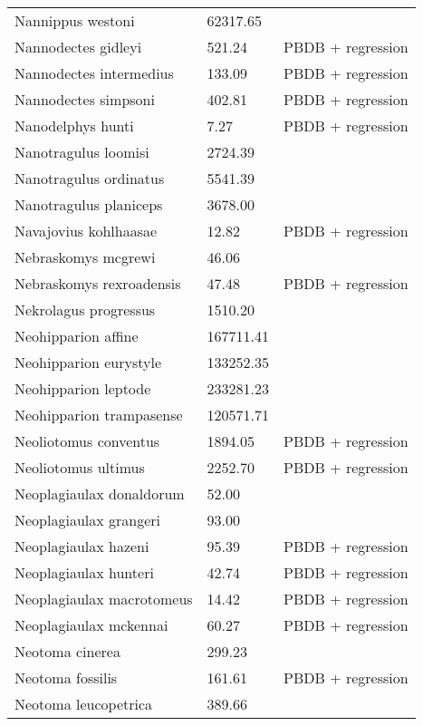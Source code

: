 \begin{center}
\begin{longtable}{p{} p{} p{} }
  Nannippus westoni & 62317.65 & \cite{Tomiya2013} \\ 
  Nannodectes gidleyi & 521.24 & PBDB + regression \\ 
  Nannodectes intermedius & 133.09 & PBDB + regression \\ 
  Nannodectes simpsoni & 402.81 & PBDB + regression \\ 
  Nanodelphys hunti & 7.27 & PBDB + regression \\ 
  Nanotragulus loomisi & 2724.39 & \cite{Tomiya2013} \\ 
  Nanotragulus ordinatus & 5541.39 & \cite{Tomiya2013} \\ 
  Nanotragulus planiceps & 3678.00 & \cite{McKenna2011} \\ 
  Navajovius kohlhaasae & 12.82 & PBDB + regression \\ 
  Nebraskomys mcgrewi & 46.06 & \cite{Tomiya2013} \\ 
  Nebraskomys rexroadensis & 47.48 & PBDB + regression \\ 
  Nekrolagus progressus & 1510.20 & \cite{Tomiya2013} \\ 
  Neohipparion affine & 167711.41 & \cite{Tomiya2013} \\ 
  Neohipparion eurystyle & 133252.35 & \cite{Tomiya2013} \\ 
  Neohipparion leptode & 233281.23 & \cite{Tomiya2013} \\ 
  Neohipparion trampasense & 120571.71 & \cite{Tomiya2013} \\ 
  Neoliotomus conventus & 1894.05 & PBDB + regression \\ 
  Neoliotomus ultimus & 2252.70 & PBDB + regression \\ 
  Neoplagiaulax donaldorum & 52.00 & \cite{Wilson2012} \\ 
  Neoplagiaulax grangeri & 93.00 & \cite{Wilson2012} \\ 
  Neoplagiaulax hazeni & 95.39 & PBDB + regression \\ 
  Neoplagiaulax hunteri & 42.74 & PBDB + regression \\ 
  Neoplagiaulax macrotomeus & 14.42 & PBDB + regression \\ 
  Neoplagiaulax mckennai & 60.27 & PBDB + regression \\ 
  Neotoma cinerea & 299.23 & \cite{Smith2004} \\ 
  Neotoma fossilis & 161.61 & PBDB + regression \\ 
  Neotoma leucopetrica & 389.66 & \cite{Grohe2010} \\ 

\end{longtable}
\end{center}
